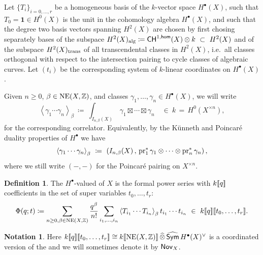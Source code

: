 \documentclass[twoside,leqno]{article}
\numberwithin{equation}{section}
\theoremstyle{plain}
\theoremstyle{definition}
\newtheorem{definition}[equation]{Definition}
\newtheorem{notation}[equation]{Notation}
\begin{document}
\medskip

Let $\{T_i\}_{i=0,\dots, r}$ be a homogeneous basis of the $k$-vector space $H^{\bullet}(X)$, such that  $T_0=\mathbf{1} \in H^0(X)$ is the unit in the cohomology algebra $H^{\bullet}(X)$, and such that the degree two basis vectors spanning $H^2(X)$ are chosen by first chosing separately bases of the subspace $H^2(X)_{\operatorname{alg}} \coloneqq \mathsf{CH}^{1,\mathsf{hom}}(X) \otimes k \ \subset \ H^2(X)$ and of the subspace $H^2(X)_{\operatorname{trans}}$ of all transcendental classes in $H^2(X)$, i.e.\ all  classes orthogonal with respect to the intersection pairing to cycle classes of algebraic curves.  Let $(t_{i})$ be the corresponding system of $k$-linear coordinates on $H^{\bullet}(X)$. 

\medskip
Given $n \geq 0$, $\beta \in \operatorname{NE}(X,\mathbb Z)$, and classes $\gamma_{1}, \ldots, \gamma_{n} \in H^{\bullet}(X)$, we will write
\[
\left\langle \gamma_{1} \cdots \gamma_{n} \right\rangle_{\beta} \ \coloneqq 
\ \int_{I_{n,\beta}(X)} \, \gamma_{1}\boxtimes \cdots \boxtimes \gamma_{n} \quad \in \ k \, = \,  H^0(X^{\times n}),
\]
for the corresponding correlator. Equivalently, by the K\"{u}nneth and Poincar\'{e} duality properties of $H^{\bullet}$ we have  
\[
\left\langle \gamma_{1} \cdots \gamma_{n} \right\rangle_{\beta} 
\ \coloneqq  
\ \left( I_{n,\beta}(X) \, , \, 
\operatorname{pr}_{1}^{*}\gamma_{1}\otimes \cdots  \otimes \operatorname{pr}_{n}^{*}\gamma_{n} \right),
\]
where we still write $(-,-)$ for the Poincar\'{e} pairing on 
$X^{\times n}$.

\begin{definition} \label{defi-GWPhi}
The $H^{\bullet}$-valued  of $X$ is the formal power series with $k[\![q]\!]$ coefficients in the set of super variables $t_{0}, \ldots, t_{r}$:
\begin{equation} \label{eq:GW_potential}
  \Phi(q;t)  \coloneqq \sum_{n\ge 0,\beta  \in \NE(X,\bbZ)} \frac{q^\beta}{n!} \sum_{i_1,\dots,i_n} \braket{T_{i_1}\cdots T_{i_n}}_\beta t_{i_1}\cdots t_{i_n} \ \in \ k\dbb{q}\dbb{t_{0},\ldots,t_{r}}.
\end{equation}
\end{definition}

\begin{notation} \label{not:novikovX} Here 
$k[\![q]\!][\![t_{0},\ldots,t_{r}]\!] \cong k[\![\operatorname{NE}(X,\mathbb Z)]\!]\, \widehat{\otimes}\, \widehat{\mathsf{Sym}}\, H^{\bullet}(X)^{\vee}$ is a coordinated version of the  and we will sometimes denote it by $\mathsf{Nov}_{X}$.
\end{notation}
\end{document}
